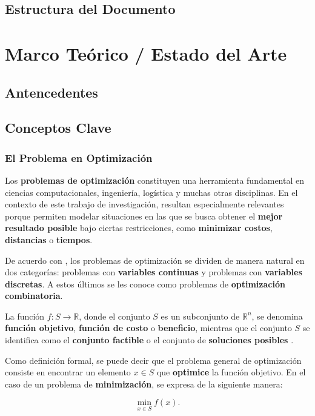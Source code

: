 \documentclass[12pt,titlepage,twoside,openright]{book}
\begin{document}
\section{Estructura del Documento}


\chapter{Marco Teórico / Estado del Arte}
\label{cap:marco-teorico}
\section{Antencedentes}
\section{Conceptos Clave}
\subsection{El Problema en Optimización}

Los \textbf{problemas de optimización} constituyen una herramienta fundamental en ciencias computacionales, ingeniería, logística y muchas otras disciplinas. En el contexto de este trabajo de investigación, resultan especialmente relevantes porque permiten modelar situaciones en las que se busca obtener el \textbf{mejor resultado posible} bajo ciertas restricciones, como \textbf{minimizar costos}, \textbf{distancias} o \textbf{tiempos}.

De acuerdo con \citep{cobos2010}, los problemas de optimización se dividen de manera natural en dos categorías: problemas con \textbf{variables continuas} y problemas con \textbf{variables discretas}. A estos últimos se les conoce como problemas de \textbf{optimización combinatoria}.

La función \(f : S \to \mathbb{R}\), donde el conjunto \(S\) es un subconjunto de \(\mathbb{R}^n\), se denomina \textbf{función objetivo}, \textbf{función de costo} o \textbf{beneficio}, mientras que el conjunto \(S\) se identifica como el \textbf{conjunto factible} o el conjunto de \textbf{soluciones posibles} \citep{cobos2010}.

Como definición formal, se puede decir que el problema general de optimización consiste en encontrar un elemento \(x \in S\) que \textbf{optimice} la función objetivo. En el caso de un problema de \textbf{minimización}, se expresa de la siguiente manera:

\[
	\min_{x \in S} f(x).
\]
\end{document}
